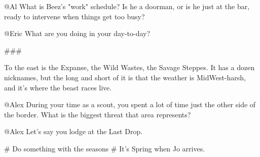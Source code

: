 @Al
What is Beez's "work" schedule?
Is he a doorman, or is he just at the bar, ready to intervene when things get too busy?

@Eric
What are you doing in your day-to-day?

###

To the east is the Expanse, the Wild Wastes, the Savage Steppes.
It has a dozen nicknames, but the long and short of it is that the weather is MidWest-harsh,
 and it's where the beast races live.

@Alex
During your time as a scout, you spent a lot of time just the other side of the border.
What is the biggest threat that area represents?

@Alex
Let's say you lodge at the Last Drop.


# Do something with the seasons
# It's Spring when Jo arrives.
